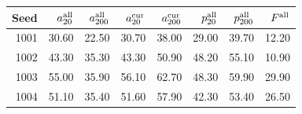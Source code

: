 \begin{tabular}{rrrrrrrr}
\toprule
Seed & $a^{\rm all}_{20}$ & $a^{\rm all}_{200}$ & $a^{\rm cur}_{20}$ & $a^{\rm cur}_{200}$ & $p^{\rm all}_{20}$ & $p^{\rm all}_{200}$ & $F^{\rm all}$ \\
\midrule
1001 & 30.60 & 22.50 & 30.70 & 38.00 & 29.00 & 39.70 & 12.20 \\
1002 & 43.30 & 35.30 & 43.30 & 50.90 & 48.20 & 55.10 & 10.90 \\
1003 & 55.00 & 35.90 & 56.10 & 62.70 & 48.30 & 59.90 & 29.90 \\
1004 & 51.10 & 35.40 & 51.60 & 57.90 & 42.30 & 53.40 & 26.50 \\
\bottomrule
\end{tabular}
